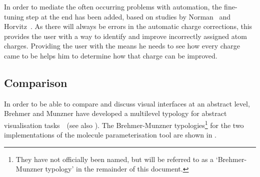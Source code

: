 In order to mediate the often occurring problems with automation, the fine-tuning step at the end has been added, based on studies by Norman~\cite{norman1990problem} and Horvitz~\cite{horvitz1999principles}. As there will always be errors in the automatic charge corrections, this provides the user with a way to identify and improve incorrectly assigned atom charges. Providing the user with the means he needs to see how every charge came to be helps him to determine how that charge can be improved.


\subsection{Comparison}
In order to be able to compare and discuss visual interfaces at an abstract level, Brehmer and Munzner have developed a multilevel typology for abstract visualisation tasks~\cite{brehmer2013multi}~(see also ). The Brehmer-Munzner typologies\footnote{They have not officially been named, but will be referred to as a `Brehmer-Munzner typology' in the remainder of this document.} for the two implementations of the molecule parameterisation tool are shown in .

